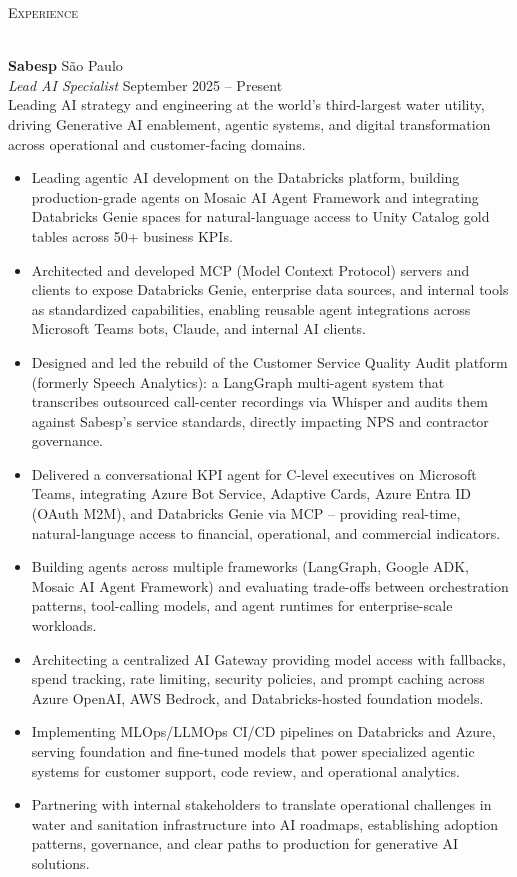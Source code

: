 \documentclass[a4paper]{article}
\newcommand{\lineunder} {
    \vspace*{-8pt} \\
    \hspace*{-18pt} \hrulefill \\
}
\newcommand{\header} [1] {
    {\hspace*{-18pt}\vspace*{6pt} \textsc{#1}}
    \vspace*{-6pt} \lineunder
}
\begin{document}
\header{Experience}
\vspace{1mm}

\textbf{Sabesp} \hfill São Paulo\\
\textit{Lead AI Specialist} \hfill September 2025 -- Present\\[2pt]
Leading AI strategy and engineering at the world's third-largest water utility, driving Generative AI enablement, agentic systems, and digital transformation across operational and customer-facing domains.
\vspace{1mm}
\begin{itemize}
\item Leading agentic AI development on the Databricks platform, building production-grade agents on Mosaic AI Agent Framework and integrating Databricks Genie spaces for natural-language access to Unity Catalog gold tables across 50+ business KPIs.
\item Architected and developed MCP (Model Context Protocol) servers and clients to expose Databricks Genie, enterprise data sources, and internal tools as standardized capabilities, enabling reusable agent integrations across Microsoft Teams bots, Claude, and internal AI clients.
\item Designed and led the rebuild of the Customer Service Quality Audit platform (formerly Speech Analytics): a LangGraph multi-agent system that transcribes outsourced call-center recordings via Whisper and audits them against Sabesp's service standards, directly impacting NPS and contractor governance.
\item Delivered a conversational KPI agent for C-level executives on Microsoft Teams, integrating Azure Bot Service, Adaptive Cards, Azure Entra ID (OAuth M2M), and Databricks Genie via MCP -- providing real-time, natural-language access to financial, operational, and commercial indicators.
\item Building agents across multiple frameworks (LangGraph, Google ADK, Mosaic AI Agent Framework) and evaluating trade-offs between orchestration patterns, tool-calling models, and agent runtimes for enterprise-scale workloads.
\item Architecting a centralized AI Gateway providing model access with fallbacks, spend tracking, rate limiting, security policies, and prompt caching across Azure OpenAI, AWS Bedrock, and Databricks-hosted foundation models.
\item Implementing MLOps/LLMOps CI/CD pipelines on Databricks and Azure, serving foundation and fine-tuned models that power specialized agentic systems for customer support, code review, and operational analytics.
\item Partnering with internal stakeholders to translate operational challenges in water and sanitation infrastructure into AI roadmaps, establishing adoption patterns, governance, and clear paths to production for generative AI solutions.
\end{itemize}
\vspace{1mm}
\end{document}
